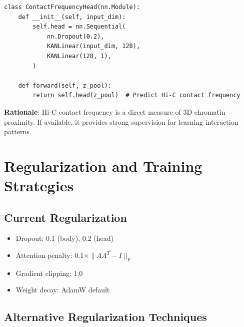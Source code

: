 \documentclass[11pt,a4paper]{article}
\begin{document}
\begin{verbatim}
class ContactFrequencyHead(nn.Module):
    def __init__(self, input_dim):
        self.head = nn.Sequential(
            nn.Dropout(0.2),
            KANLinear(input_dim, 128),
            KANLinear(128, 1),
        )
    
    def forward(self, z_pool):
        return self.head(z_pool)  # Predict Hi-C contact frequency
\end{verbatim}

\textbf{Rationale}: Hi-C contact frequency is a direct measure of 3D chromatin proximity. If available, it provides strong supervision for learning interaction patterns.

\section{Regularization and Training Strategies}

\subsection{Current Regularization}

\begin{itemize}
    \item Dropout: 0.1 (body), 0.2 (head)
    \item Attention penalty: $0.1 \times \|AA^T - I\|_F$
    \item Gradient clipping: 1.0
    \item Weight decay: AdamW default
\end{itemize}

\subsection{Alternative Regularization Techniques}
\end{document}
